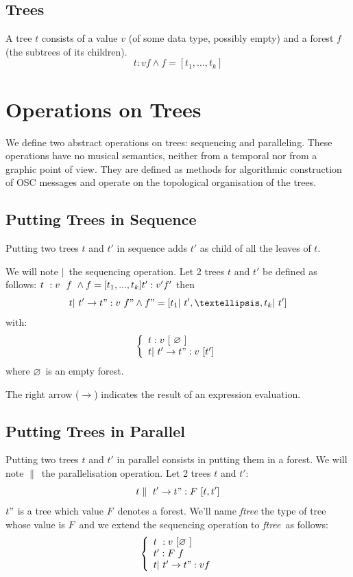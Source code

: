 \documentclass[runningheads]{llncs}
\newcommand{\llist}	[1]		{\ensuremath{[#1_1,...,#1_k]}}
\newcommand{\nulltree}	{\ensuremath{\varnothing}}
\newcommand{\seq}		{\ensuremath{|}}
\newcommand{\paral}		{\ensuremath{\parallel}}
\newcommand{\foret}		{\ensuremath{F}}
\newcommand{\ftree}		{ftree}
\newcommand{\etc}		{\ensuremath{…}}
\begin{document}
\subsection{Trees}
A tree $t$ consists of a value $v$ (of some data type, possibly empty) and a forest $f$ (the subtrees of its children).
\[
	t :  v f \land f = \llist{t} 
\]


\section{Operations on Trees}

We define two abstract operations on trees: sequencing and paralleling. These operations have no musical semantics, neither from a temporal nor from a graphic point of view. They are defined as methods for algorithmic construction of OSC messages and operate on the topological organisation of the trees. 

\subsection{Putting Trees in Sequence}
Putting two trees $t$ and $t'$ in sequence adds $t'$ as child of all the leaves of $t$.


We will note \seq\ the sequencing operation.
Let 2 trees $t$ and $t'$ be defined as follows:
$t \ :  v \ \ f \ \land f = \llist{t} \\
t' :  v' f'\\$
then
\[
	t \seq\ t'  \to  t" : v\ f" \land f" = [t_1 \seq\ t',\etc, t_k \seq\ t']
\]
with: 
\[
\left\{
\begin{array}{l}
	t :  v \ [\ \nulltree\ ] \\
	t \seq\ t'  \to  t" : v\ [ t' ] \\
\end{array}
\right.
\]
where \nulltree\ is an empty forest.

The right arrow ($\to$) indicates the result of an expression evaluation.

\subsection{Putting Trees in Parallel}
Putting two trees $t$ and $t'$ in parallel consists in putting them in a forest.
We will note \paral\ the parallelisation operation. 
Let 2 trees $t$ and $t'$:
\[
	t \paral\ t'  \to  t" : \foret\ [ t, t' ]
\]
$t"$ is a tree which value \foret\ denotes a forest. 
We'll name \emph{\ftree} the type of tree whose value is \foret\ and we extend the sequencing operation to \emph{\ftree}\ as follows:
\[
\left\{
\begin{array}{l}
	t \ :  v\ [ \nulltree\ ] \\
	t' :  \foret\ f\\
	t \seq\ t'  \to  t" : v f \\
\end{array}
\right.
\]
\end{document}
